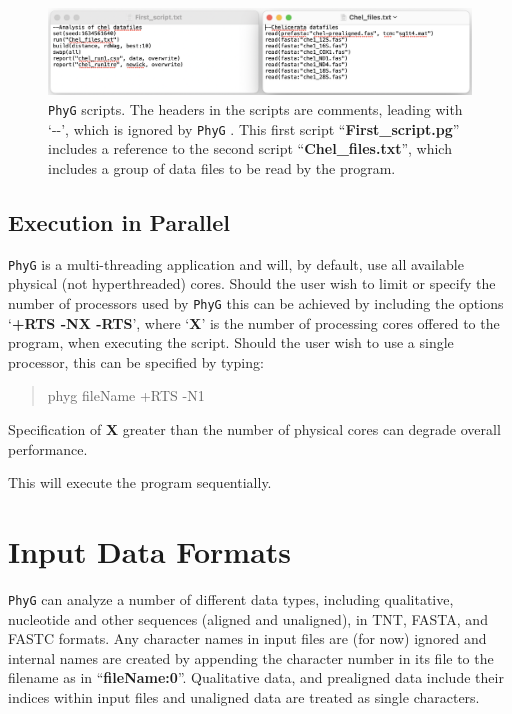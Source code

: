 \documentclass[11pt]{book}
\newcommand{\phyg}{\texttt{PhyG} }
\begin{document}
{{		\begin{figure}[H]
		\centering
		\includegraphics[width=\textwidth]{First_run.jpg}
		\caption{\phyg scripts. The headers in the scripts are comments, leading with `-{}-', 
		which is ignored by \phyg. This first script ``\textbf{First\_script.pg}'' includes a reference 
		to the second script ``\textbf{Chel\_files.txt}'', which includes a group of data files to be 
		read by the program.}
		\label{firstscript}
		\end{figure}
	
	\subsection{Execution in Parallel}
	\label{subsec:parallel}
		\phyg is a multi-threading application and will, by default,  use all available physical 
		(not hyperthreaded) cores. Should the user wish to limit or specify the number of 
		processors used by \phyg this can be achieved by including the options 
		`\textbf{+RTS -NX -RTS}', where `\textbf{X}' is the number of processing cores 
		offered to the program, when executing the script. Should the user wish to use a 
		single processor, this can be specified by typing:

		\begin{quote}
		phyg fileName +RTS -N1 
		\end{quote}
		
		Specification of \textbf{X} greater than the number of physical cores can degrade 
		overall performance.
		
		\medskip
		\noindent This will execute the program sequentially.		

		
\section{Input Data Formats} 
	\phyg can analyze a number of different data types, including qualitative, nucleotide
	and other sequences  (aligned and unaligned), in TNT, FASTA, and FASTC formats. 
	Any character names in input files are (for now) ignored and internal names are 
	created by appending the character number in its file to the filename as in 
	``\textbf{fileName:0}''. Qualitative data, and prealigned data include their indices within 
	input files and unaligned data are treated as single characters.
	
}}
\end{document}
